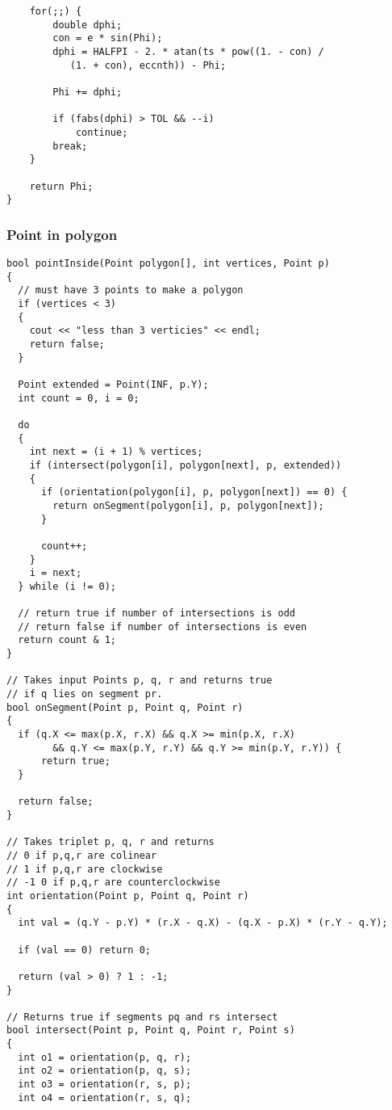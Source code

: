 \documentclass{article}
\begin{document}
\begin{lstlisting}
    for(;;) {
        double dphi;
        con = e * sin(Phi);
        dphi = HALFPI - 2. * atan(ts * pow((1. - con) /
           (1. + con), eccnth)) - Phi;

        Phi += dphi;

        if (fabs(dphi) > TOL && --i)
            continue;
        break;
    }

    return Phi;
}
\end{lstlisting}

\subsubsection{Point in polygon}
\begin{lstlisting}
bool pointInside(Point polygon[], int vertices, Point p)
{
  // must have 3 points to make a polygon
  if (vertices < 3)
  {
    cout << "less than 3 verticies" << endl;
    return false;
  }

  Point extended = Point(INF, p.Y);
  int count = 0, i = 0;

  do
  {
    int next = (i + 1) % vertices;
    if (intersect(polygon[i], polygon[next], p, extended))
    {
      if (orientation(polygon[i], p, polygon[next]) == 0) {
        return onSegment(polygon[i], p, polygon[next]);
      }

      count++;
    }
    i = next;
  } while (i != 0);

  // return true if number of intersections is odd
  // return false if number of intersections is even
  return count & 1;
}

// Takes input Points p, q, r and returns true
// if q lies on segment pr.
bool onSegment(Point p, Point q, Point r)
{
  if (q.X <= max(p.X, r.X) && q.X >= min(p.X, r.X)
        && q.Y <= max(p.Y, r.Y) && q.Y >= min(p.Y, r.Y)) {
      return true;
  }

  return false;
}

// Takes triplet p, q, r and returns
// 0 if p,q,r are colinear
// 1 if p,q,r are clockwise
// -1 0 if p,q,r are counterclockwise
int orientation(Point p, Point q, Point r)
{
  int val = (q.Y - p.Y) * (r.X - q.X) - (q.X - p.X) * (r.Y - q.Y);

  if (val == 0) return 0;

  return (val > 0) ? 1 : -1;
}

// Returns true if segments pq and rs intersect
bool intersect(Point p, Point q, Point r, Point s)
{
  int o1 = orientation(p, q, r);
  int o2 = orientation(p, q, s);
  int o3 = orientation(r, s, p);
  int o4 = orientation(r, s, q);


\end{lstlisting}
\end{document}
